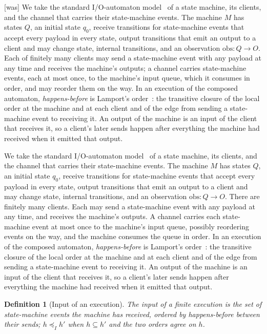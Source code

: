 \documentclass[sigconf]{cidr-2027}
\newtheorem{definition}{Definition}
\theoremstyle{remark}
\newcommand{\InputOrd}{\preceq_I}
\begin{document}
{\footnotesize\color{black!50}\noindent\textsf{[was]} We take the standard I/O-automaton model~\cite{lynch1987io} of a state
machine, its clients, and the channel that carries their state-machine events.  The machine
$M$ has states $Q$, an initial state $q_0$, receive transitions for
state-machine events that accept every payload in every state, output transitions that
emit an output to a client and may change state, internal transitions, and an
observation $\mathrm{obs}:Q\to O$.  Each of finitely many clients may send a
state-machine event with any payload at any time and receives the machine's outputs; a
channel carries state-machine events, each at most once, to the machine's input queue, which
it consumes in order, and may reorder them on the way.  In an execution of the
composed automaton, \emph{happens-before} is Lamport's
order~\cite{lamport1978time}: the transitive closure of the local order at the
machine and at each client and of the edge from sending a state-machine event to receiving
it.  An output of the machine is an input of the client that receives it, so a
client's later sends happen after everything the machine had received when it
emitted that output.\par}

\color{blue!70!black}We take the standard I/O-automaton model~\cite{lynch1987io} of a state
machine, its clients, and the channel that carries their state-machine events.  The machine
$M$ has states $Q$, an initial state $q_0$, receive transitions for
state-machine events that accept every payload in every state, output transitions that
emit an output to a client and may change state, internal transitions, and an
observation $\mathrm{obs}:Q\to O$.  There are finitely many clients.  Each may send a state-machine event with
any payload at any time, and receives the machine's outputs.  A channel
carries each state-machine event at most once to the machine's input queue,
possibly reordering events on the way, and the machine consumes the queue in
order.  In an execution of the
composed automaton, \emph{happens-before} is Lamport's
order~\cite{lamport1978time}: the transitive closure of the local order at the
machine and at each client and of the edge from sending a state-machine event to receiving
it.  An output of the machine is an input of the client that receives it, so a
client's later sends happen after everything the machine had received when it
emitted that output.\color{black}

\begin{definition}[Input of an execution]
\label{def:execution-input}
The \emph{input} of a finite execution is the set of state-machine events the machine has
received, ordered by happens-before between their sends; $h\InputOrd h'$ when
$h\subseteq h'$ and the two orders agree on $h$.
\end{definition}
\end{document}
